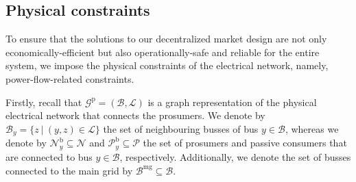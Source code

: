 \documentclass{IEEEtran}  %
\newtheorem{definition}{Definition}
\newcommand{\eod}{\ensuremath{\hfill\Box}}
\newcommand{\mc}{\mathcal}
\newcommand{\bb}{\mathbb}
\newcommand{\col}{\operatorname{col}}
\newcommand{\0}{\mathbf{0}}
\newcommand{\1}{\mathbf{1}}
\begin{document}

\subsection{Physical constraints}

To ensure that the solutions to our decentralized market design are not only economically-efficient but also operationally-safe and reliable for the entire system, we impose the physical constraints of the electrical network, namely, power-flow-related constraints.

Firstly, recall that $\mc G^{\mathrm p}=(\mc B, \mc L)$ is a graph representation of the physical electrical network that connects the prosumers. We  denote by $\mc B_y =\{z~|~(y,z) \in \mc L\}$ the set of neighbouring busses of bus $y \in \mc B$, whereas we denote by $\mc N_y^{\mathrm b} \subseteq \mc N$ and $\mc P_y^\mathrm{b} \subseteq \mc P$ the set of prosumers and passive consumers that are connected to bus $y \in \mc B$, respectively. 
Additionally, we denote the set of busses connected to the main grid by $\mc B^{\mathrm{mg}} \subseteq \mc B$.
\end{document}
